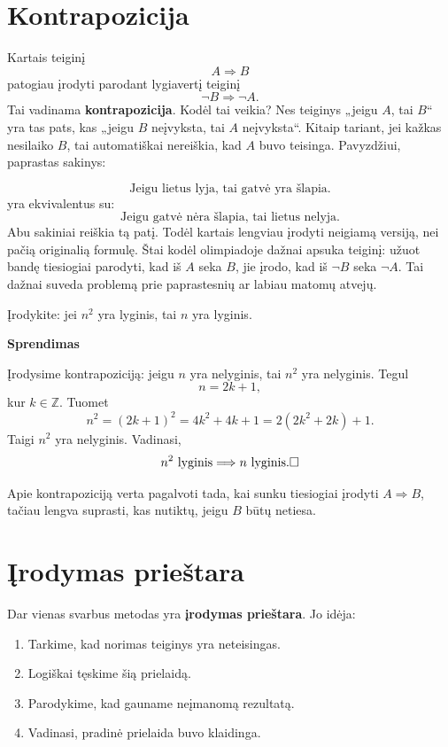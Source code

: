 \documentclass[11pt,a4paper]{scrartcl}
\newenvironment{solution}
    {\begin{list}{}{\setlength{\leftmargin}{10pt}\setlength{\rightmargin}{10pt}}\item[]}
    {\end{list}}
\begin{document}
\section{Kontrapozicija}

Kartais teiginį
\[
A\Longrightarrow B
\]
patogiau įrodyti parodant lygiavertį teiginį
\[
\neg B\Longrightarrow \neg A.
\]
Tai vadinama \textbf{kontrapozicija}.
Kodėl tai veikia? Nes teiginys „jeigu $A$, tai $B$“ yra tas pats, kas
„jeigu $B$ neįvyksta, tai $A$ neįvyksta“. Kitaip tariant, jei kažkas
nesilaiko $B$, tai automatiškai nereiškia, kad $A$ buvo teisinga. Pavyzdžiui, paprastas sakinys:

\[
\text{Jeigu lietus lyja, tai gatvė yra šlapia.}
\]
yra ekvivalentus su:
\[
\text{Jeigu gatvė nėra šlapia, tai lietus nelyja.}
\]
Abu sakiniai reiškia tą patį. Todėl kartais lengviau įrodyti
neigiamą versiją, nei pačią originalią formulę. Štai kodėl olimpiadoje dažnai apsuka teiginį: užuot bandę tiesiogiai
parodyti, kad iš $A$ seka $B$, jie įrodo, kad iš $\neg B$ seka $\neg A$.
Tai dažnai suveda problemą prie paprastesnių ar labiau matomų atvejų.

\begin{example}
Įrodykite: jei $n^2$ yra lyginis, tai $n$ yra lyginis.
\end{example}

\begin{solution}
\textbf{Sprendimas}

Įrodysime kontrapoziciją: jeigu $n$ yra nelyginis, tai $n^2$ yra
nelyginis. Tegul
\[
n=2k+1,
\]
kur $k\in\mathbb Z$. Tuomet
\[
n^2=(2k+1)^2=4k^2+4k+1
=2(2k^2+2k)+1.
\]
Taigi $n^2$ yra nelyginis. Vadinasi,
\[
n^2\text{ lyginis}\Longrightarrow n\text{ lyginis}. \hfill \square
\]
\end{solution}

Apie kontrapoziciją verta pagalvoti tada, kai sunku tiesiogiai įrodyti
$A\Longrightarrow B$, tačiau lengva suprasti, kas nutiktų, jeigu $B$
būtų netiesa.

\section{Įrodymas prieštara}

Dar vienas svarbus metodas yra \textbf{įrodymas prieštara}. Jo idėja:

\begin{enumerate}
    \renewcommand{\labelenumi}{\textbf{\theenumi.}}
    \item Tarkime, kad norimas teiginys yra neteisingas.
    \item Logiškai tęskime šią prielaidą.
    \item Parodykime, kad gauname neįmanomą rezultatą.
    \item Vadinasi, pradinė prielaida buvo klaidinga.
\end{enumerate}
\end{document}
